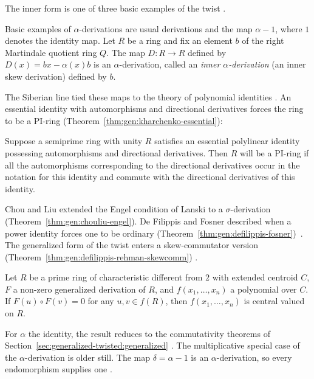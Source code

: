 The inner form is one of three basic examples of the twist
\cite[p.~885]{DeFilippisFosner2012}.

\begin{remark}\label{rem:gen:alpha-examples}
Basic examples of $\alpha$-derivations are usual derivations and the map
$\alpha-1$, where $1$ denotes the identity map.
Let $R$ be a ring and fix an element $b$ of the right Martindale quotient
ring $Q$.
The map $D\colon R\to R$ defined by $D(x)=bx-\alpha(x)b$ is an
$\alpha$-derivation, called an
\emph{inner $\alpha$-derivation} (an inner skew derivation) defined by $b$.
\end{remark}

The Siberian line tied these maps to the theory of polynomial identities
\cite[p.~1045]{KharchenkoPopov1991}. An essential identity with automorphisms
and directional derivatives forces the ring to be a PI-ring
(Theorem~\ref{thm:gen:kharchenko-essential}):

\begin{theorem}\label{thm:gen:kharchenko-essential}
Suppose a semiprime ring with unity $R$ satisfies an essential polylinear
identity possessing automorphisms and directional derivatives. Then $R$ will
be a PI-ring if all the automorphisms corresponding to the directional
derivatives occur in the notation for this identity and commute with the
directional derivatives of this identity.
\end{theorem}

Chou and Liu extended the Engel condition of Lanski to a $\sigma$-derivation
(Theorem~\ref{thm:gen:chouliu-engel}). De Filippis and Fosner described
when a power identity forces one to be ordinary
(Theorem~\ref{thm:gen:defilippis-fosner})~\cite[Theorem~1.3, p.~843]{DeFilippisRehman2010}. The generalized form of the
twist enters a skew-commutator version (Theorem~\ref{thm:gen:defilippis-rehman-skewcomm})
\cite[p.~843]{DeFilippisRehman2010}.\begin{theorem}\label{thm:gen:defilippis-rehman-skewcomm}
Let $R$ be a prime ring of characteristic different from $2$ with extended
centroid $C$, $F$ a non-zero generalized derivation of $R$, and
$f(x_{1},\dots,x_{n})$ a polynomial over $C$. If $F(u)\circ F(v)=0$ for any
$u,v\in f(R)$, then $f(x_{1},\dots,x_{n})$ is central valued on $R$.
\end{theorem}

For $\alpha$ the identity, the result reduces to the commutativity theorems of
Section~\ref{sec:generalized-twisted:generalized} \cite[p.~1148]{Hvala1998}.
The multiplicative special case of the $\alpha$-derivation is older still. The
map $\delta=\alpha-1$ is an $\alpha$-derivation, so every endomorphism
supplies one \cite[p.~885]{DeFilippisFosner2012}.

